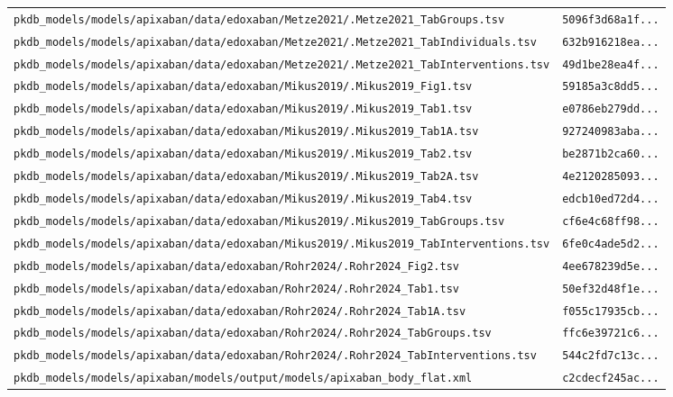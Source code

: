 \begin{longtable}{ll}
\texttt{pkdb\_models/models/apixaban/data/edoxaban/Metze2021/.Metze2021\_TabGroups.tsv} & \texttt{5096f3d68a1f...} \\
\texttt{pkdb\_models/models/apixaban/data/edoxaban/Metze2021/.Metze2021\_TabIndividuals.tsv} & \texttt{632b916218ea...} \\
\texttt{pkdb\_models/models/apixaban/data/edoxaban/Metze2021/.Metze2021\_TabInterventions.tsv} & \texttt{49d1be28ea4f...} \\
\texttt{pkdb\_models/models/apixaban/data/edoxaban/Mikus2019/.Mikus2019\_Fig1.tsv} & \texttt{59185a3c8dd5...} \\
\texttt{pkdb\_models/models/apixaban/data/edoxaban/Mikus2019/.Mikus2019\_Tab1.tsv} & \texttt{e0786eb279dd...} \\
\texttt{pkdb\_models/models/apixaban/data/edoxaban/Mikus2019/.Mikus2019\_Tab1A.tsv} & \texttt{927240983aba...} \\
\texttt{pkdb\_models/models/apixaban/data/edoxaban/Mikus2019/.Mikus2019\_Tab2.tsv} & \texttt{be2871b2ca60...} \\
\texttt{pkdb\_models/models/apixaban/data/edoxaban/Mikus2019/.Mikus2019\_Tab2A.tsv} & \texttt{4e2120285093...} \\
\texttt{pkdb\_models/models/apixaban/data/edoxaban/Mikus2019/.Mikus2019\_Tab4.tsv} & \texttt{edcb10ed72d4...} \\
\texttt{pkdb\_models/models/apixaban/data/edoxaban/Mikus2019/.Mikus2019\_TabGroups.tsv} & \texttt{cf6e4c68ff98...} \\
\texttt{pkdb\_models/models/apixaban/data/edoxaban/Mikus2019/.Mikus2019\_TabInterventions.tsv} & \texttt{6fe0c4ade5d2...} \\
\texttt{pkdb\_models/models/apixaban/data/edoxaban/Rohr2024/.Rohr2024\_Fig2.tsv} & \texttt{4ee678239d5e...} \\
\texttt{pkdb\_models/models/apixaban/data/edoxaban/Rohr2024/.Rohr2024\_Tab1.tsv} & \texttt{50ef32d48f1e...} \\
\texttt{pkdb\_models/models/apixaban/data/edoxaban/Rohr2024/.Rohr2024\_Tab1A.tsv} & \texttt{f055c17935cb...} \\
\texttt{pkdb\_models/models/apixaban/data/edoxaban/Rohr2024/.Rohr2024\_TabGroups.tsv} & \texttt{ffc6e39721c6...} \\
\texttt{pkdb\_models/models/apixaban/data/edoxaban/Rohr2024/.Rohr2024\_TabInterventions.tsv} & \texttt{544c2fd7c13c...} \\
\texttt{pkdb\_models/models/apixaban/models/output/models/apixaban\_body\_flat.xml} & \texttt{c2cdecf245ac...} \\
\end{longtable}

